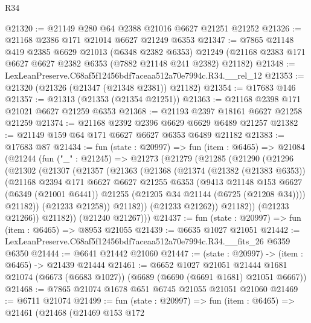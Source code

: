 \begin{lexlean}{R34}
\begin{coremodule}
@21320 := @21149 @280 @64 @2388 @21016 @6627 @21251 @21252
@21326 := @21168 @2386 @171 @21014 @6627 @21249 @6353
@21347 := @7865
    @21148
    @419
    @2385
    @6629
    @21013
    (@6348 @2382 @6353)
    @21249
    (@21168 @2383 @171 @6627 @6627 @2382 @6353 (@7882 @21148 @241 @2382) @21182)
@21348 := LexLeanPreserve.C68af5f12456bdf7aceaa512a70e7994c.R34.__rel_12
@21353 := @21320 (@21326 (@21347 (@21348 @2381)) @21182)
@21354 := @17683 @146
@21357 := @21313 (@21353 (@21354 @21251))
@21363 := @21168 @2398 @171 @21021 @6627 @21259 @6353
@21368 := @21193 @2397 @18161 @6627 @21258 @21259
@21374 := @21168 @2392 @2396 @6629 @6629 @6489 @21257
@21382 := @21149 @159 @64 @171 @6627 @6627 @6353 @6489 @21182
@21383 := @17683 @87
@21434 := fun (state : @20997) =>
  fun (item : @6465) =>
  @21084
    (@21244
      (fun ("_" : @21245) =>
      @21273
        (@21279
          (@21285
            (@21290
              (@21296
                (@21302
                  (@21307
                    (@21357
                      (@21363
                        (@21368
                          (@21374
                            (@21382 (@21383 @6353))
                            (@21168
                              @2394
                              @171
                              @6627
                              @6627
                              @21255
                              @6353
                              (@9413
                                @21148
                                @153
                                @6627
                                (@6349 (@21001 @6441))
                                @21255
                                (@21205 @34 @21144 (@6725 (@21208 @34))))
                              @21182))
                          (@21233 @21258))
                        @21182))
                    (@21233 @21262))
                  @21182))
              (@21233 @21266))
            @21182))
        (@21240 @21267)))
@21437 := fun (state : @20997) => fun (item : @6465) => @8953 @21055
@21439 := @6635 @1027 @21051
@21442 := LexLeanPreserve.C68af5f12456bdf7aceaa512a70e7994c.R34.__fits_26 @6359 @6350
@21444 := @6641 @21442 @21060
@21447 := (state : @20997) -> (item : @6465) -> @21439 @21444
@21461 := @6652
    @1027
    @21051
    @21444
    @1681
    @21074
    (@6673 (@6683 @1027))
    (@6689 (@6690 (@6691 @1681) @21051 @6667))
@21468 := @7865 @21074 @1678 @651 @6745 @21055 @21051 @21060
@21469 := @6711 @21074
@21499 := fun (state : @20997) =>
  fun (item : @6465) =>
  @21461
    (@21468
      (@21469
        @153
        @172

\end{coremodule}
\end{lexlean}
